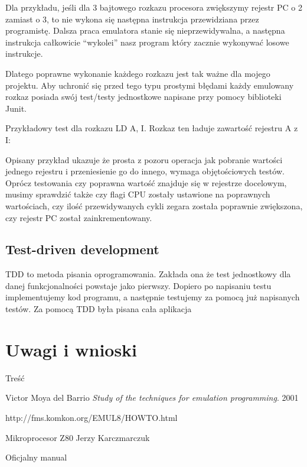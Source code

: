 \documentclass{article}
\begin{document}
	Dla przykładu, jeśli dla 3 bajtowego rozkazu procesora zwiększymy rejestr PC o 2 zamiast o 3, to nie wykona się następna instrukcja przewidziana przez programistę. Dalsza praca emulatora stanie się nieprzewidywalna, a następna instrukcja całkowicie “wykolei” nasz program który zacznie wykonywać losowe instrukcje. 
	
	Dlatego poprawne wykonanie każdego rozkazu jest tak ważne dla mojego projektu. Aby uchronić się przed tego typu prostymi błędami każdy emulowany rozkaz posiada swój test/testy jednostkowe napisane przy pomocy biblioteki Junit. 
	
	Przykładowy test dla rozkazu LD A, I. Rozkaz ten ładuje zawartość rejestru A z I:
	
	
	Opisany przykład ukazuje że prosta z pozoru operacja jak pobranie wartości jednego rejestru i przeniesienie go do innego, wymaga objętościowych testów. Oprócz testowania czy poprawna wartość znajduje się w rejestrze docelowym, musimy sprawdzić także czy flagi CPU zostały ustawione na poprawnych wartościach, czy ilość przewidywanych cykli zegara została poprawnie zwiększona, czy rejestr PC został zainkrementowany. 
	
	\subsection{Test-driven development}
	TDD to metoda pisania oprogramowania. Zakłada ona że test jednostkowy dla danej funkcjonalności powstaje jako pierwszy. Dopiero po napisaniu testu implementujemy kod programu, a następnie testujemy za pomocą już napisanych testów. Za pomocą TDD była pisana cała aplikacja
	
	\section{Uwagi i wnioski}
	Treść
	
	\begin{thebibliography}{9}
		Victor Moya del Barrio
		\emph{Study of the techniques for emulation programming}.
		2001
		
		http://fms.komkon.org/EMUL8/HOWTO.html
		
		Mikroprocesor Z80 Jerzy Karczmarczuk
		
		 Oficjalny manual
	\end{thebibliography}
	
\end{document}
